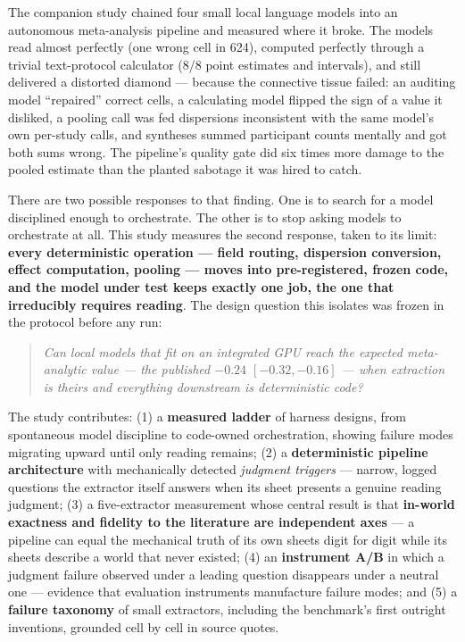 \documentclass[11pt]{article}
\begin{document}
The companion study \citep{barra2026companion} chained four small local language models into an autonomous meta-analysis pipeline and measured where it broke. The models read almost perfectly (one wrong cell in 624), computed perfectly through a trivial text-protocol calculator (8/8 point estimates and intervals), and still delivered a distorted diamond --- because the connective tissue failed: an auditing model ``repaired'' correct cells, a calculating model flipped the sign of a value it disliked, a pooling call was fed dispersions inconsistent with the same model's own per-study calls, and syntheses summed participant counts mentally and got both sums wrong. The pipeline's quality gate did six times more damage to the pooled estimate than the planted sabotage it was hired to catch.

There are two possible responses to that finding. One is to search for a model disciplined enough to orchestrate. The other is to stop asking models to orchestrate at all. This study measures the second response, taken to its limit: \textbf{every deterministic operation --- field routing, dispersion conversion, effect computation, pooling --- moves into pre-registered, frozen code, and the model under test keeps exactly one job, the one that irreducibly requires reading}. The design question this isolates was frozen in the protocol before any run:

\begin{quote}
\emph{Can local models that fit on an integrated GPU reach the expected meta-analytic value --- the published $-0.24$ $[-0.32, -0.16]$ --- when extraction is theirs and everything downstream is deterministic code?}
\end{quote}

The study contributes: (1) a \textbf{measured ladder} of harness designs, from spontaneous model discipline to code-owned orchestration, showing failure modes migrating upward until only reading remains; (2) a \textbf{deterministic pipeline architecture} with mechanically detected \emph{judgment triggers} --- narrow, logged questions the extractor itself answers when its sheet presents a genuine reading judgment; (3) a five-extractor measurement whose central result is that \textbf{in-world exactness and fidelity to the literature are independent axes} --- a pipeline can equal the mechanical truth of its own sheets digit for digit while its sheets describe a world that never existed; (4) an \textbf{instrument A/B} in which a judgment failure observed under a leading question disappears under a neutral one --- evidence that evaluation instruments manufacture failure modes; and (5) a \textbf{failure taxonomy} of small extractors, including the benchmark's first outright inventions, grounded cell by cell in source quotes.
\end{document}
